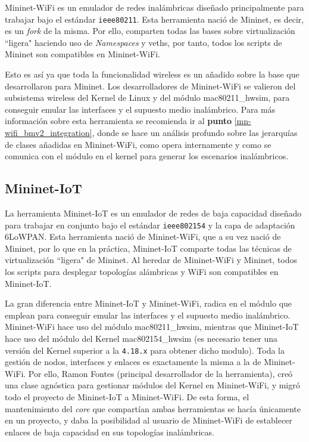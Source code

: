 Mininet-WiFi \cite{7367387} es un emulador de redes inalámbricas diseñado principalmente para trabajar bajo el estándar \texttt{ieee80211}. Esta herramienta nació de Mininet, es decir, es un \textit{fork} de la misma. Por ello, comparten todas las bases sobre virtualización ``ligera" haciendo uso de \textit{Namespaces} y \gls{veth}s, por tanto, todos los scripts de Mininet son compatibles en Mininet-WiFi. \\
\par
Esto es así ya que toda la funcionalidad wireless es un añadido sobre la base que desarrollaron para Mininet. Los desarrolladores de Mininet-WiFi se valieron del subsistema wireless del Kernel de Linux y del módulo mac80211\_hwsim, para conseguir emular las interfaces y el supuesto medio inalámbrico. Para más información sobre esta herramienta se recomienda ir al \textbf{punto} \ref{mn-wifi_bmv2_integration}, donde se hace un análisis profundo sobre las jerarquías de clases añadidas en Mininet-WiFi, como opera internamente y como se comunica con el módulo en el kernel para generar los escenarios inalámbricos.



\subsection{Mininet-IoT}
\label{mininetIoT}

La herramienta Mininet-IoT \cite{mininetIOT} es un emulador de redes de baja capacidad diseñado para trabajar en conjunto bajo el estándar \texttt{ieee802154} y la capa de adaptación 6LoWPAN. Esta herramienta nació de Mininet-WiFi, que a su vez nació de Mininet, por lo que en la práctica, Mininet-IoT comparte todas las técnicas de virtualización ``ligera" de Mininet. Al heredar de Mininet-WiFi y Mininet, todos los scripts para desplegar topologías alámbricas y WiFi son compatibles en Mininet-IoT.  \\
\par

La gran diferencia entre Mininet-IoT y Mininet-WiFi, radica en el módulo que emplean para conseguir emular las interfaces y el supuesto medio inalámbrico. Mininet-WiFi hace uso del módulo mac80211\_hwsim, mientras que Mininet-IoT hace uso del módulo del Kernel mac802154\_hwsim (es necesario tener una versión del Kernel superior a la \texttt{4.18.x} para obtener dicho modulo). Toda la gestión de nodos, interfaces y enlaces es exactamente la misma a la de Mininet-WiFi. Por ello, Ramon Fontes (principal desarrollador de la herramienta), creó una clase agnóstica para gestionar módulos del Kernel en Mininet-WiFi, y migró todo el proyecto de Mininet-IoT a Mininet-WiFi. De esta forma, el mantenimiento del \textit{core} que compartían ambas herramientas se hacía únicamente en un proyecto, y daba la posibilidad al usuario de Mininet-WiFi de establecer enlaces de baja capacidad en sus topologías inalámbricas.  